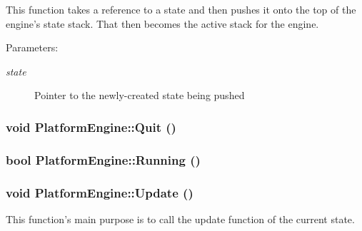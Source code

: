 This function takes a reference to a state and then pushes it onto the top of the engine's state stack. That then becomes the active stack for the engine.

\begin{Desc}
\item[Parameters:]
\begin{description}
\item[{\em state}]Pointer to the newly-created state being pushed \end{description}
\end{Desc}
\hypertarget{class_platform_engine_dbcdd91813cabbe51bb2f86eb23e772a}{
\subsubsection[{Quit}]{\setlength{\rightskip}{0pt plus 5cm}void PlatformEngine::Quit ()}}
\label{db/da1/class_platform_engine_dbcdd91813cabbe51bb2f86eb23e772a}


\hypertarget{class_platform_engine_31ec37c0222f4694cc3c0e819e143038}{
\subsubsection[{Running}]{\setlength{\rightskip}{0pt plus 5cm}bool PlatformEngine::Running ()}}
\label{db/da1/class_platform_engine_31ec37c0222f4694cc3c0e819e143038}


\hypertarget{class_platform_engine_d3ab75304226ad3fcac6b66ce3cedbc7}{
\subsubsection[{Update}]{\setlength{\rightskip}{0pt plus 5cm}void PlatformEngine::Update ()}}
\label{db/da1/class_platform_engine_d3ab75304226ad3fcac6b66ce3cedbc7}


This function's main purpose is to call the update function of the current state. 